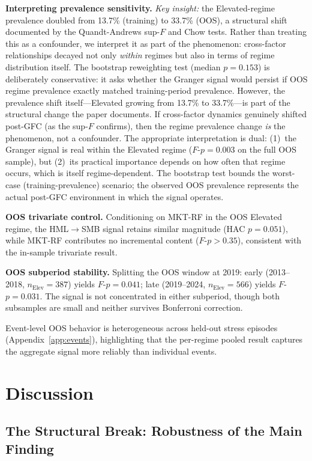 \documentclass[sigconf,anonymous]{acmart}
\begin{document}
\textbf{Interpreting prevalence sensitivity.}
\emph{Key insight:} the Elevated-regime prevalence doubled from 13.7\%
(training) to 33.7\% (OOS), a structural shift documented by the
Quandt-Andrews sup-$F$ and Chow tests. Rather than treating this as a
confounder, we interpret it as part of the phenomenon: cross-factor
relationships decayed not only \emph{within} regimes but also in terms
of regime distribution itself.
The bootstrap reweighting test (median $p = 0.153$) is
deliberately conservative: it asks whether the Granger signal would persist
if OOS regime prevalence exactly matched training-period prevalence.
However, the prevalence shift itself---Elevated growing from 13.7\% to
33.7\%---is part of the structural change the paper documents.
If cross-factor dynamics genuinely shifted post-GFC (as the sup-$F$ confirms),
then the regime prevalence change \emph{is} the phenomenon, not a confounder.
The appropriate interpretation is dual: (1)~the Granger signal is real within
the Elevated regime ($F$-$p = 0.003$ on the full OOS sample), but
(2)~its practical importance depends on how often that regime occurs, which
is itself regime-dependent. The bootstrap test bounds the worst-case
(training-prevalence) scenario; the observed OOS prevalence represents
the actual post-GFC environment in which the signal operates.

\textbf{OOS trivariate control.}
Conditioning on MKT-RF in the OOS Elevated regime, the HML$\to$SMB signal retains
similar magnitude (HAC $p = 0.051$), while MKT-RF contributes no incremental content
($F$-$p > 0.35$), consistent with the in-sample trivariate result.

\textbf{OOS subperiod stability.}
Splitting the OOS window at 2019: early (2013--2018, $n_{\text{Elev}} = 387$)
yields $F$-$p = 0.041$; late (2019--2024, $n_{\text{Elev}} = 566$) yields
$F$-$p = 0.031$. The signal is not concentrated in either subperiod,
though both subsamples are small and neither survives Bonferroni correction.

Event-level OOS behavior is heterogeneous across held-out stress episodes
(Appendix~\ref{app:events}), highlighting that the per-regime pooled result
captures the aggregate signal more reliably than individual events.

\section{Discussion}

\subsection{The Structural Break: Robustness of the Main Finding}
\label{sec:robustness}
\end{document}
